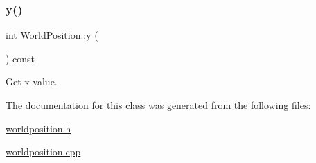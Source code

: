 \subsubsection{\texorpdfstring{y()}{y()}}
{\footnotesize\ttfamily int World\+Position\+::y (\begin{DoxyParamCaption}{ }\end{DoxyParamCaption}) const}



Get x value. 



The documentation for this class was generated from the following files\+:\begin{DoxyCompactItemize}
\item 
\mbox{\hyperlink{worldposition_8h}{worldposition.\+h}}\item 
\mbox{\hyperlink{worldposition_8cpp}{worldposition.\+cpp}}\end{DoxyCompactItemize}
